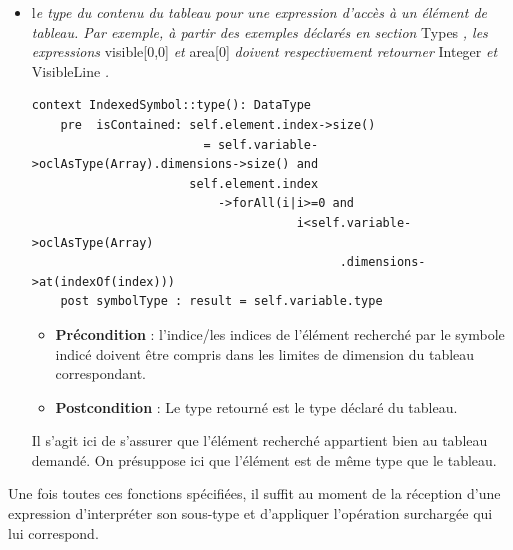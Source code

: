 \documentclass[oneside,a4paper]{book}
\begin{document}
\begin{itemize}
    \item l\textit{e type du contenu du tableau pour une expression d'accès à un élément de tableau. Par exemple, à partir des exemples déclarés en section} Types \textit{, les expressions} visible[0,0] \textit{et} area[0] \textit{doivent respectivement retourner} Integer \textit{et} VisibleLine \textit{.}
    \begin{lstlisting}
context IndexedSymbol::type(): DataType
    pre  isContained: self.element.index->size() 
                        = self.variable->oclAsType(Array).dimensions->size() and
                      self.element.index
                          ->forAll(i|i>=0 and 
                                     i<self.variable->oclAsType(Array)
                                           .dimensions->at(indexOf(index)))
    post symbolType : result = self.variable.type
    \end{lstlisting}
    \begin{itemize}
        \item \textbf{Précondition} : l'indice/les indices de l'élément recherché par le symbole indicé doivent être compris dans les limites de dimension du tableau correspondant.
        \item \textbf{Postcondition} : Le type retourné est le type déclaré du tableau.
    \end{itemize}
    
    Il s'agit ici de s'assurer que l'élément recherché appartient bien au tableau demandé. On présuppose ici que l'élément est de même type que le tableau.
    
\end{itemize}

Une fois toutes ces fonctions spécifiées, il suffit au moment de la réception d'une expression d'interpréter son sous-type et d'appliquer l'opération surchargée qui lui correspond.
\end{document}
